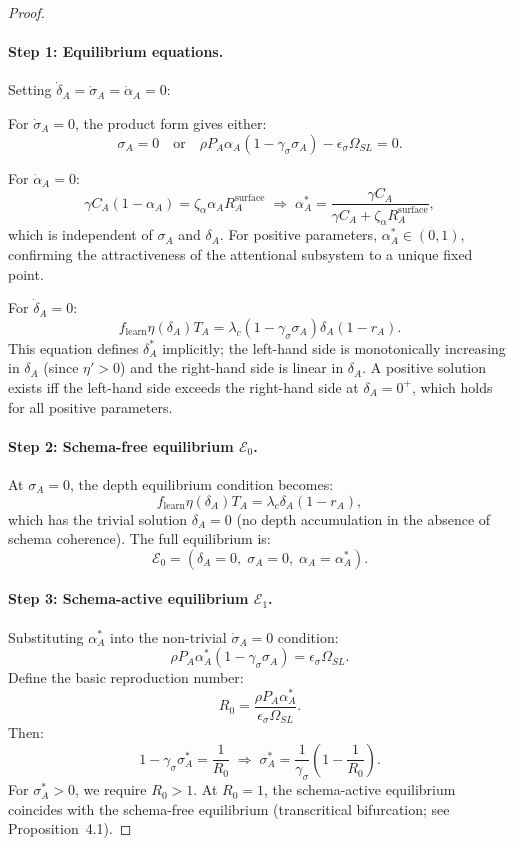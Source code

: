 \begin{proof}

\paragraph{Step 1: Equilibrium equations.}
Setting $\dot{\delta}_A = \dot{\sigma}_A = \dot{\alpha}_A = 0$:

For $\dot{\sigma}_A = 0$, the product form gives either:
\[
\sigma_A = 0 \quad\text{or}\quad \rho P_A \alpha_A (1 - \gamma_\sigma \sigma_A) - \epsilon_\sigma \Omega_{SL} = 0.
\]

For $\dot{\alpha}_A = 0$:
\[
\gamma C_A (1 - \alpha_A) = \zeta_\alpha \alpha_A R_A^{\text{surface}}
\;\Longrightarrow\; \alpha_A^* = \frac{\gamma C_A}{\gamma C_A + \zeta_\alpha R_A^{\text{surface}}},
\]
which is independent of $\sigma_A$ and $\delta_A$. For positive
parameters, $\alpha_A^* \in (0,1)$, confirming the attractiveness
of the attentional subsystem to a unique fixed point.

For $\dot{\delta}_A = 0$:
\[
f_{\text{learn}} \eta(\delta_A) T_A = \lambda_c (1 - \gamma_\sigma \sigma_A) \delta_A (1 - r_A).
\]
This equation defines $\delta_A^*$ implicitly; the left-hand side is
monotonically increasing in $\delta_A$ (since $\eta' > 0$) and the
right-hand side is linear in $\delta_A$. A positive solution exists
iff the left-hand side exceeds the right-hand side at $\delta_A = 0^+$,
which holds for all positive parameters.

\paragraph{Step 2: Schema-free equilibrium $\mathcal{E}_0$.}
At $\sigma_A = 0$, the depth equilibrium condition becomes:
\[
f_{\text{learn}} \eta(\delta_A) T_A = \lambda_c \delta_A (1 - r_A),
\]
which has the trivial solution $\delta_A = 0$ (no depth accumulation
in the absence of schema coherence). The full equilibrium is:
\[
\mathcal{E}_0 = (\delta_A = 0,\; \sigma_A = 0,\; \alpha_A = \alpha_A^*).
\]

\paragraph{Step 3: Schema-active equilibrium $\mathcal{E}_1$.}
Substituting $\alpha_A^*$ into the non-trivial $\dot{\sigma}_A = 0$
condition:
\[
\rho P_A \alpha_A^* (1 - \gamma_\sigma \sigma_A) = \epsilon_\sigma \Omega_{SL}.
\]
Define the basic reproduction number:
\[
R_0 = \frac{\rho P_A \alpha_A^*}{\epsilon_\sigma \Omega_{SL}}.
\]
Then:
\[
1 - \gamma_\sigma \sigma_A^* = \frac{1}{R_0}
\;\Longrightarrow\; \sigma_A^* = \frac{1}{\gamma_\sigma}\left(1 - \frac{1}{R_0}\right).
\]
For $\sigma_A^* > 0$, we require $R_0 > 1$. At $R_0 = 1$, the
schema-active equilibrium coincides with the schema-free equilibrium
(transcritical bifurcation; see Proposition~4.1).


\end{proof}
